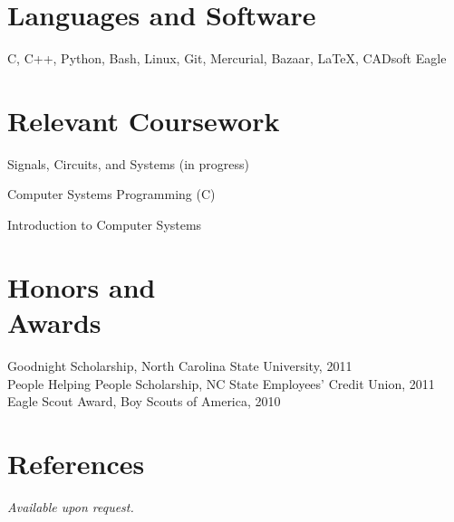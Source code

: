 \documentclass[margin,line,letterpaper]{resume}
\begin{document}
\begin{resume}
    \section{\mysidestyle Languages and Software} 

    C, C++, Python, Bash, Linux, Git, Mercurial, Bazaar, \LaTeX,  CADsoft Eagle


    \section{\mysidestyle Relevant Coursework}

    \begin{list2}
    \item Signals, Circuits, and Systems (in progress)
    \item Computer Systems Programming (C)
    \item Introduction to Computer Systems
    \end{list2}\vspace{-1.5mm}


    \section{\mysidestyle Honors and\\Awards} 

    Goodnight Scholarship, North Carolina State University, 2011              \vspace{-8mm}\\%

    People Helping People Scholarship, NC State Employees' Credit Union, 2011 \vspace{-8mm}\\%

    Eagle Scout Award, Boy Scouts of America, 2010

    \section{\mysidestyle References} 
    {\sl Available upon request.}




\end{resume}
\end{document}
